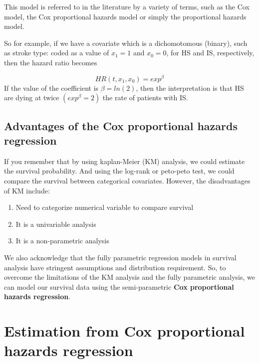 \documentclass[
  10pt,
]{krantz}
\providecommand{\tightlist}{%
  \setlength{\itemsep}{0pt}\setlength{\parskip}{0pt}}
\begin{document}
This model is referred to in the literature by a variety of terms, such as the Cox model, the Cox proportional hazards model or simply the proportional hazards model.

So for example, if we have a covariate which is a dichomotomous (binary), such as stroke type: coded as a value of \(x_1 = 1\) and \(x_0 = 0\), for HS and IS, respectively, then the hazard ratio becomes

\[HR(t,x_1, x_0) = exp^\beta\]
If the value of the coefficient is \(\beta = ln(2)\), then the interpretation is that HS are dying at twice \((exp^\beta = 2)\) the rate of patients with IS.

\hypertarget{advantages-of-the-cox-proportional-hazards-regression}{%
\subsection{\texorpdfstring{Advantages of the Cox proportional hazards regression}{Advantages of the Cox proportional hazards regression}}\label{advantages-of-the-cox-proportional-hazards-regression}}

If you remember that by using kaplan-Meier (KM) analysis, we could estimate the survival probability. And using the log-rank or peto-peto test, we could compare the survival between categorical covariates. However, the disadvantages of KM include:

\begin{enumerate}
\def\labelenumi{\arabic{enumi}.}
\tightlist
\item
  Need to categorize numerical variable to compare survival
\item
  It is a univariable analysis
\item
  It is a non-parametric analysis
\end{enumerate}

We also acknowledge that the fully parametric regression models in survival analysis have stringent assumptions and distribution requirement. So, to overcome the limitations of the KM analysis and the fully parametric analysis, we can model our survival data using the semi-parametric \textbf{Cox proportional hazards regression}.

\hypertarget{estimation-from-cox-proportional-hazards-regression}{%
\section{\texorpdfstring{Estimation from Cox proportional hazards regression}{Estimation from Cox proportional hazards regression}}\label{estimation-from-cox-proportional-hazards-regression}}
\end{document}
